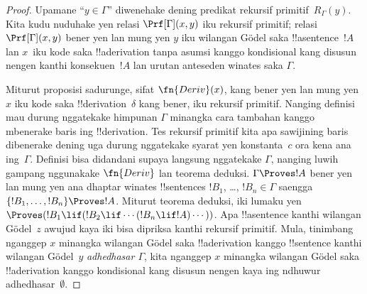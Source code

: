 \documentclass[../../../include/open-logic-section]{subfiles}
\begin{document}
\begin{proof}
Upamane ``$y \in \Gamma$'' diwenehake dening predikat
rekursif primitif~$R_\Gamma(y)$. Kita kudu nuduhake yen relasi
$\Prf[\Gamma](x, y)$ iku rekursif primitif; relasi
$\Prf[\Gamma](x, y)$ bener yen lan mung yen $y$ iku
wilangan G\"odel saka !!a{sentence}~$!A$ lan $x$~iku
kode saka !!a{derivation} tanpa asumsi kanggo kondisional kang disusun nengen kanthi konsekuen~$!A$ lan urutan anteseden winates saka $\Gamma$.

Miturut proposisi sadurunge, sifat $\fn{Deriv}(x)$, kang bener
yen lan mung yen $x$ iku kode saka !!{derivation}~$\delta$
kang bener, iku rekursif primitif. Nanging definisi mau durung
nggatekake himpunan $\Gamma$ minangka cara tambahan kanggo
mbenerake baris ing !!{derivation}. Tes rekursif primitif kita
apa sawijining baris dibenerake dening \QR{} uga durung
nggatekake syarat yen konstanta~$c$ ora kena ana ing~$\Gamma$.
Definisi bisa didandani supaya langsung nggatekake $\Gamma$,
nanging luwih gampang nggunakake $\fn{Deriv}$ lan teorema
deduksi. $\Gamma \Proves !A$ bener yen lan mung yen ana dhaptar
winates !!{sentence}s $!B_1$, \dots, $!B_n \in \Gamma$
saengga $\{!B_1, \dots, !B_n\} \Proves !A$. Miturut teorema
deduksi, iki lumaku yen $\Proves (!B_1 \lif (!B_2 \lif
\cdots (!B_n \lif !A)\cdots))$. Apa !!a{sentence} kanthi
wilangan G\"odel~$z$ awujud kaya iki bisa dipriksa kanthi
rekursif primitif. Mula, tinimbang nganggep $x$ minangka
wilangan G\"odel saka !!a{derivation} kanggo !!{sentence}
kanthi wilangan G\"odel~$y$ \emph{adhedhasar $\Gamma$},
kita nganggep $x$ minangka wilangan G\"odel saka
!!a{derivation} kanggo kondisional kang disusun nengen kaya ing ndhuwur
adhedhasar~$\emptyset$.


\end{proof}
\end{document}
